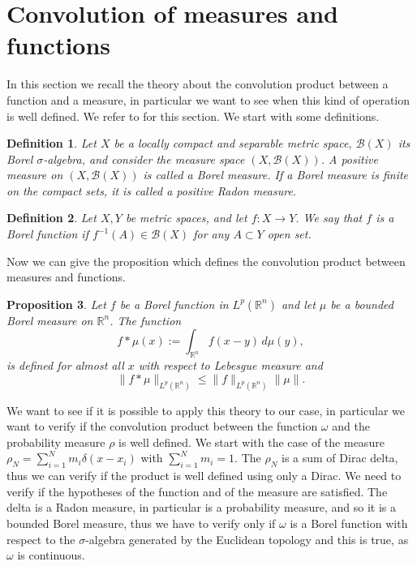 \documentclass[11pt,a4paper,oneside]{amsart}
\newtheorem{definition}{Definition}[section]
\newtheorem{prop}[definition]{Proposition}
\newcommand\R{\mathbb{R}}
\begin{document}
\section{Convolution of measures and functions}\label{sec:convolution}
\setcounter{equation}{0}
In this section we recall the theory about the convolution product between a function and a measure, 
in particular we want to see when this kind of operation is well defined. 
We refer to \cite{AmbrosioFuscoPallara,Bogachev} %
for this section. We start with some definitions.
\begin{definition}
    Let $X$ be a locally compact and separable metric space, $\mathcal{B}(X)$ its Borel $\sigma$-algebra, 
    and consider the measure space $(X,\mathcal{B}(X))$. A positive measure on $(X,\mathcal{B}(X))$ is called 
    a Borel measure. If a Borel measure is finite on the compact sets, it is called a positive Radon measure.
\end{definition}
\begin{definition}
    Let $X,Y$ be metric spaces, and let $f:X\to Y$. We say that $f$ is a Borel function if 
    $f^{-1}(A)\in\mathcal{B}(X)$ for any $A\subset Y$ open set.
\end{definition}
Now we can give the proposition which defines the convolution product between measures and functions.
\begin{prop}
    Let $f$ be a Borel function in $L^p(\R^n)$ and let $\mu$ be a bounded Borel measure on $\R^n$. The function
    $$f\ast\mu(x):=\int_{\R^n} f(x-y)\,d\mu(y),
    $$
    is defined for almost all $x$ with respect to Lebesgue measure and
    $$
    \|f\ast\mu\|_{L^p(\R^n)}\leq \|f\|_{L^p(\R^n)}\|\mu\|.
    $$
\end{prop}
We want to see if it is possible to apply this theory to our case, in particular we want to verify 
if the convolution product between the function $\omega$ and the probability measure $\rho$ is well defined.
We start with the case of the measure $\rho_N=\sum_{i=1}^N m_i\delta(x-x_i)$ with $\sum_{i=1}^N m_i=1$. 
The $\rho_N$ is a sum of Dirac delta, thus we can verify if the product is well defined using only a Dirac.
We need to verify if the hypotheses of the function and of the measure are satisfied. The delta is a Radon measure, 
in particular is a probability measure, and so it is a bounded Borel measure, thus we have to verify only if 
$\omega$ is a Borel function with respect to the $\sigma$-algebra generated by the Euclidean topology and 
this is true, as $\omega$ is continuous.
\end{document}
